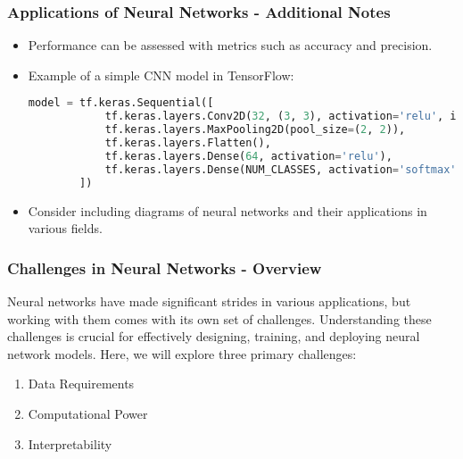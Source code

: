 \documentclass[aspectratio=169]{beamer}
\begin{document}
\begin{frame}[fragile]
    \frametitle{Applications of Neural Networks - Additional Notes}
    \begin{itemize}
        \item Performance can be assessed with metrics such as accuracy and precision.
        \item Example of a simple CNN model in TensorFlow:
        \begin{lstlisting}[language=Python]
        model = tf.keras.Sequential([
            tf.keras.layers.Conv2D(32, (3, 3), activation='relu', input_shape=(IMG_HEIGHT, IMG_WIDTH, CHANNELS)),
            tf.keras.layers.MaxPooling2D(pool_size=(2, 2)),
            tf.keras.layers.Flatten(),
            tf.keras.layers.Dense(64, activation='relu'),
            tf.keras.layers.Dense(NUM_CLASSES, activation='softmax')
        ])
        \end{lstlisting}
        \item Consider including diagrams of neural networks and their applications in various fields.
    \end{itemize}
\end{frame}

\begin{frame}[fragile]
    \frametitle{Challenges in Neural Networks - Overview}
    Neural networks have made significant strides in various applications, but working with them comes with its own set of challenges. Understanding these challenges is crucial for effectively designing, training, and deploying neural network models. Here, we will explore three primary challenges: 
    \begin{enumerate}
        \item Data Requirements
        \item Computational Power
        \item Interpretability
    \end{enumerate}
\end{frame}
\end{document}
